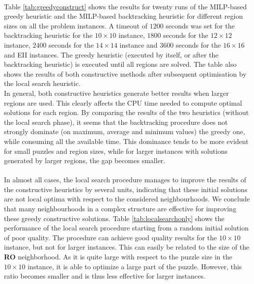 \documentclass[preprint,12pt]{elsarticle}
\begin{document}
\\
Table \ref{tab:greedyconstruct} shows the results for twenty runs of the MILP-based greedy heuristic and the MILP-based backtracking heuristic for different region sizes on all the problem instances.
A timeout of $1200$ seconds was set for the backtracking heuristic for the $10\times 10$ instance, $1800$ seconds for the $12\times 12$ instance, $2400$ seconds for the $14\times 14$ instance and $3600$ seconds for the $16\times 16$ and EII instances.
The greedy heuristic (executed by itself, or after the backtracking heuristic) is executed until all regions are solved.
The table also shows the results of both constructive methods after subsequent optimisation by the local search heuristic.\\
In general, both constructive heuristics generate better results when larger regions are used. 
This clearly affects the CPU time needed to compute optimal solutions for each region. %
By comparing the results of the two heuristics (without the local search phase), it seems that the backtracking procedure does not strongly dominate (on maximum, average and minimum values) the greedy one, while consuming all the available time.
This dominance tends to be more evident for small puzzles and region sizes, while for larger instances with solutions generated by larger regions, the gap becomes smaller.
\\
\\
In almost all cases, the local search procedure manages to improve the results of the constructive heuristics by several units, %
indicating that these initial solutions are not local optima with respect to the considered neighbourhoods. We conclude that  many neighbourhoods in a complex structure are effective for improving these greedy constructive solutions.
Table \ref{tab:localsearchonly} shows the performance of the local search procedure starting from a random initial solution of poor quality. 
The procedure can achieve good quality results for the $10\times 10$ instance, but not for larger instances. This can easily be related to the size of the \textbf{RO} neighborhood.
As it is quite large with respect to the puzzle size in the $10\times 10$ instance, it is able to optimize a large part of the puzzle. However, this ratio becomes smaller and is thus less effective for larger instances.
\end{document}
